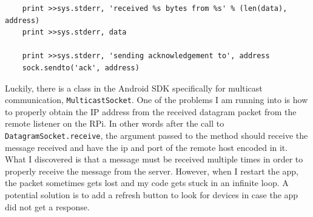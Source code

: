 \documentclass[fontsize=11pt, %
                             paper=a4, %
                             twoside, %
                             captions=tableheading,
                             index=totoc,
                             hyperref]{labbook}
\begin{document}
\begin{addmargin}[0cm]{0cm}
\begin{Verbatim}
    print >>sys.stderr, 'received %s bytes from %s' % (len(data), address)
    print >>sys.stderr, data

    print >>sys.stderr, 'sending acknowledgement to', address
    sock.sendto('ack', address)
\end{Verbatim}
Luckily, there is a class in the Android SDK specifically for multicast communication, \texttt{MulticastSocket}. One of the problems I am running into is how to properly obtain the IP address from the received datagram packet from the remote listener on the RPi. In other words after the call to \texttt{DatagramSocket.receive}, the argument passed to the method should receive the message received and have the ip and port of the remote host encoded in it. What I discovered is that a message must be received multiple times in order to properly receive the message from the server. However, when I restart the app, the packet sometimes gets lost and my code gets stuck in an infinite loop. A potential solution is to add a refresh button to look for devices in case the app did not get a response.


\end{addmargin}
\end{document}
